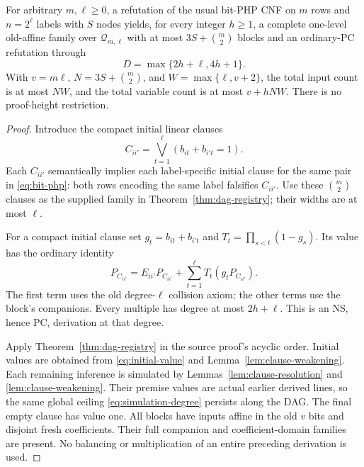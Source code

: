 \begin{theorem}\label{thm:clause-transfer}
For arbitrary \(m,\ell\ge0\), a refutation of the usual bit-PHP CNF
on \(m\) rows and \(n=2^\ell\) labels with \(S\) nodes yields, for every
integer \(h\ge1\), a complete one-level old-affine family over
\(\mathcal Q_{m,\ell}\) with at most \(3S+\binom m2\) blocks and an ordinary-PC
refutation through
\begin{equation}\label{eq:simulation-degree}
 D=\max\{2h+\ell,4h+1\}.
\end{equation}
With \(v=m\ell\), \(N=3S+\binom m2\), and
\(W=\max\{\ell,v+2\}\), the total input count is at most \(NW\),
and the total variable count is at most \(v+hNW\). There is no proof-height restriction.
\end{theorem}
\begin{proof}
 Introduce the compact initial linear clauses
\[
 C_{ii'}=\bigvee_{t=1}^\ell(b_{it}+b_{i't}=1).
\]
Each \(C_{ii'}\) semantically implies each label-specific initial clause
for the same pair in \eqref{eq:bit-php}: both rows encoding the same
label falsifies \(C_{ii'}\).
Use these \(\binom m2\) clauses as the supplied family in
Theorem~\ref{thm:dag-registry}; their widths are at most \(\ell\).

For a compact initial clause set \(g_t=b_{it}+b_{i't}\) and
\(T_t=\prod_{s<t}(1-g_s)\).
Its value has the ordinary identity
\begin{equation}\label{eq:initial-value}
 P_{C_{ii'}}=E_{ii'}P_{C_{ii'}}
                 +\sum_{t=1}^{\ell}T_t(g_tP_{C_{ii'}}).
\end{equation}
The first term uses the old degree-\(\ell\) collision axiom;
the other terms use the block's companions.
Every multiple has degree at most \(2h+\ell\).
This is an NS, hence PC, derivation at that degree.

Apply Theorem~\ref{thm:dag-registry} in the source proof's acyclic order.
Initial values are obtained from \eqref{eq:initial-value} and
Lemma~\ref{lem:clause-weakening}. Each remaining inference is simulated
by Lemmas~\ref{lem:clause-resolution} and \ref{lem:clause-weakening}.
Their premise values are actual earlier derived lines, so the same
global ceiling \eqref{eq:simulation-degree} persists along the DAG.
The final empty clause has value one.
All blocks have inputs affine in the old \(v\) bits and disjoint fresh
coefficients. Their full companion and coefficient-domain families
are present. No balancing or multiplication of an entire preceding
derivation is used.
\end{proof}
